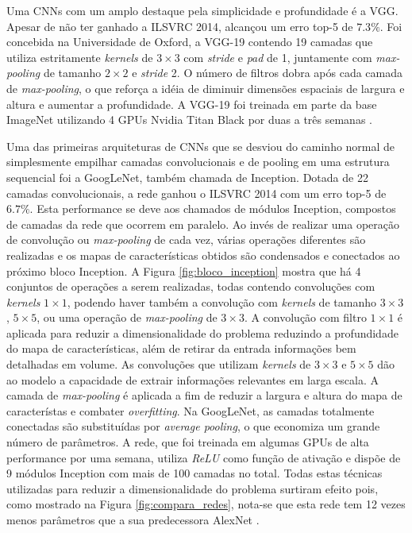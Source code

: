 Uma CNNs com um amplo destaque pela simplicidade e profundidade é a VGG. Apesar de não ter ganhado a ILSVRC 2014, alcançou um erro top-5 de $7.3\%$. Foi concebida na Universidade de Oxford, a VGG-19 contendo 19 camadas que utiliza estritamente  \emph{kernels} de $3 \times 3$ com \emph{stride} e \emph{pad} de 1, juntamente com \emph{max-pooling} de tamanho $2 \times 2$ e \emph{stride} 2. O número de filtros dobra após cada camada de \emph{max-pooling}, o que reforça a idéia de diminuir dimensões espaciais de largura e altura e aumentar a profundidade. A VGG-19 foi treinada em parte da base ImageNet utilizando 4 GPUs Nvidia Titan Black por duas a três semanas \cite{vggnet}.

Uma das primeiras arquiteturas de CNNs que se desviou do caminho normal de simplesmente empilhar camadas convolucionais e de pooling em uma estrutura sequencial foi a GoogLeNet, também chamada de Inception. Dotada de 22 camadas convolucionais, a rede ganhou o ILSVRC 2014 com um erro top-5 de $6.7\%$. Esta performance se deve aos chamados de módulos Inception, compostos de camadas da rede que ocorrem em paralelo. Ao invés de realizar uma operação de convolução ou \emph{max-pooling} de cada vez, várias operações diferentes são realizadas e os mapas de características obtidos são condensados e conectados ao próximo bloco Inception. A Figura \ref{fig:bloco_inception} mostra que há 4 conjuntos de operações a serem realizadas, todas contendo convoluções com  \emph{kernels} $1 \times 1$, podendo haver também a convolução com \emph{kernels} de tamanho $3 \times 3$, $5 \times 5$, ou uma operação de \emph{max-pooling} de $3\times 3$. A convolução com filtro $1\times 1$ é aplicada para reduzir a dimensionalidade do problema reduzindo a profundidade do mapa de características, além de retirar da entrada informações bem detalhadas em volume. As convoluções que utilizam \emph{kernels} de $3\times 3$ e $5\times 5$ dão ao modelo a capacidade de extrair informações relevantes em larga escala. A camada de \emph{max-pooling} é aplicada a fim de reduzir a largura e altura do mapa de característas e combater \emph{overfitting}. Na GoogLeNet, as camadas totalmente conectadas são substituídas por \emph{average pooling}, o que economiza um grande número de parâmetros. A rede, que foi treinada em algumas GPUs de alta performance por uma semana, utiliza \emph{ReLU} como função de ativação e dispõe de 9 módulos Inception com mais de 100 camadas no total. Todas estas técnicas utilizadas para reduzir a dimensionalidade do problema surtiram efeito pois, como mostrado na Figura \ref{fig:compara_redes}, nota-se que esta rede tem 12 vezes menos parâmetros que a sua predecessora AlexNet \cite{inception}.

